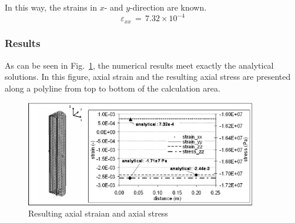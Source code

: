 In this way, the strains in $x$- and $y$-direction are known.
\begin{displaymath}
\varepsilon_{xx}\,=\,7.32\times 10^{-4}
\end{displaymath}

\subsubsection{Results}
\label{subsubsec:Me4_res}

As can be seen in Fig.~\ref{Me_fig33}, the numerical results meet exactly the analytical solutions. In this figure, axial strain and the resulting axial stress are presented along a polyline from top to bottom of the calculation area.

\begin{figure}[htbp]
\centering
\includegraphics[width=0.9\textwidth]{PART_II/M/fig33.eps}
\caption{Resulting axial straian and axial stress}
\label{Me_fig33}
\end{figure}
